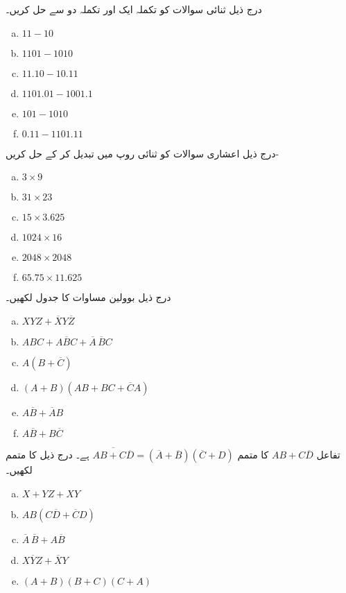 درج ذیل ثنائی سوالات کو تکملہ ایک اور تکملہ دو سے حل کریں۔
\begin{multicols}{3}
\begin{enumerate}[a.]
\item  
 \(11-10\)  
\item  
 \(1101-1010\) 
\item  
 \(11.10-10.11\) 
\item  
 \(1101.01-1001.1\) 
\item  
 \(101-1010\) 
\item  
 \(0.11-1101.11\) 
\end{enumerate}
\end{multicols}
درج ذیل اعشاری سوالات کو ثنائی روپ میں تبدیل کر کے حل کریں-
\begin{multicols}{4}
\begin{enumerate}[a.]
\item 
 \(3\times 9\)   
\item 
 \(31\times 23\)   
\item 
 \(15\times 3.625\)  
\item  
 \(1024\times 16\) 
\item 
 \(2048\times 2048\) 
\item 
 \(65.75\times 11.625\) 
\end{enumerate}
\end{multicols}
درج ذیل بوولین مساوات کا جدول لکھیں۔
\begin{multicols}{2}
\begin{enumerate}[a.]
\item 
 \(XYZ+\overline{X}Y\overline{Z}\) 
\item 
 \(ABC+A\overline{B}C+\overline{A}\,\overline{B}C\)   

\item 
 \(A(B+\overline{C})\)  
\item 
 \((A+B)(AB+BC+\overline{C}A)\)  

\item 
 \(A\overline{B}+\overline{A}B\)  
\item 
 \(A\overline{B}+B\overline{C}\) 
\end{enumerate}
\end{multicols}
تفاعل 
 \(AB+C\overline{D}\)
  کا متمم   \(\overline{AB+C\overline{D}}=(\overline{A}+\overline{B})(\overline{C}+D)\) ہے۔ درج ذیل کا  متمم لکھیں۔
\begin{multicols}{2}
\begin{enumerate}[a.]
\item  
 \(X+YZ+XY\) 
\item 
 \(AB(C\overline{D}+\overline{C}D)\)
\item   
 \(\overline{A}\,\overline{B}+A\overline{B}\) 
\item  
 \(X\overline{Y}Z+\overline{X}Y\) 
\item 
 \((A+B)(B+C)(C+A)\)
\end{enumerate}
\end{multicols}
